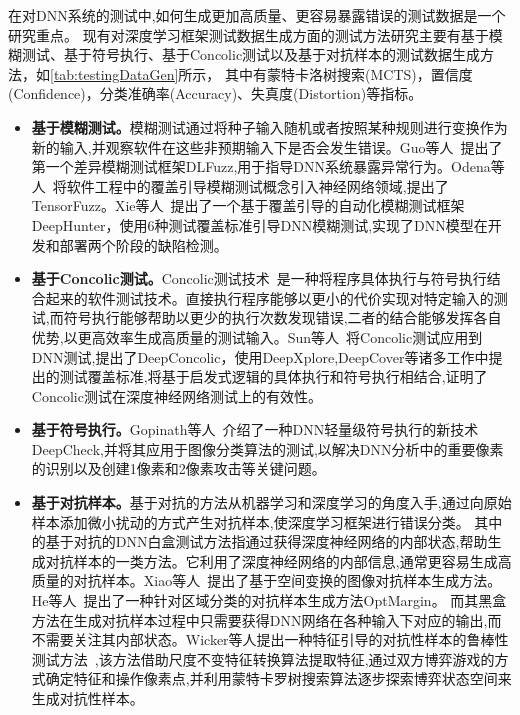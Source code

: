 在对DNN系统的测试中,如何生成更加高质量、更容易暴露错误的测试数据是一个研究重点。
现有对深度学习框架测试数据生成方面的测试方法研究主要有基于模糊测试、基于符号执行、基于Concolic测试以及基于对抗样本的测试数据生成方法，如\cref{tab:testingDataGen}所示，
其中有蒙特卡洛树搜索(MCTS)，置信度(Confidence)，分类准确率(Accuracy)、失真度(Distortion)等指标。


\begin{itemize}
	\item \textbf{基于模糊测试。}模糊测试通过将种子输入随机或者按照某种规则进行变换作为新的输入,并观察软件在这些非预期输入下是否会发生错误。Guo等人~提出了第一个差异模糊测试框架DLFuzz,用于指导DNN系统暴露异常行为。Odena等人~将软件工程中的覆盖引导模糊测试概念引入神经网络领域,提出了TensorFuzz。Xie等人~提出了一个基于覆盖引导的自动化模糊测试框架DeepHunter，使用6种测试覆盖标准引导DNN模糊测试,实现了DNN模型在开发和部署两个阶段的缺陷检测。

	\item \textbf{基于Concolic测试。}Concolic测试技术~\cite{Majumdar2007Hybrid}是一种将程序具体执行与符号执行结合起来的软件测试技术。直接执行程序能够以更小的代价实现对特定输入的测试,而符号执行能够帮助以更少的执行次数发现错误,二者的结合能够发挥各自优势,以更高效率生成高质量的测试输入。Sun等人~将Concolic测试应用到DNN测试,提出了DeepConcolic，使用DeepXplore,DeepCover等诸多工作中提出的测试覆盖标准,将基于启发式逻辑的具体执行和符号执行相结合,证明了Concolic测试在深度神经网络测试上的有效性。

	\item \textbf{基于符号执行。}Gopinath等人~介绍了一种DNN轻量级符号执行的新技术DeepCheck,并将其应用于图像分类算法的测试,以解决DNN分析中的重要像素的识别以及创建1像素和2像素攻击等关键问题。

	\item \textbf{基于对抗样本。}基于对抗的方法从机器学习和深度学习的角度入手,通过向原始样本添加微小扰动的方式产生对抗样本,使深度学习框架进行错误分类。
	      其中的基于对抗的DNN白盒测试方法指通过获得深度神经网络的内部状态,帮助生成对抗样本的一类方法。它利用了深度神经网络的内部信息,通常更容易生成高质量的对抗样本。Xiao等人~提出了基于空间变换的图像对抗样本生成方法。He等人~提出了一种针对区域分类的对抗样本生成方法OptMargin。
	      而其黑盒方法在生成对抗样本过程中只需要获得DNN网络在各种输入下对应的输出,而不需要关注其内部状态。Wicker等人提出一种特征引导的对抗性样本的鲁棒性测试方法~,该方法借助尺度不变特征转换算法提取特征,通过双方博弈游戏的方式确定特征和操作像素点,并利用蒙特卡罗树搜索算法逐步探索博弈状态空间来生成对抗性样本。
\end{itemize}


